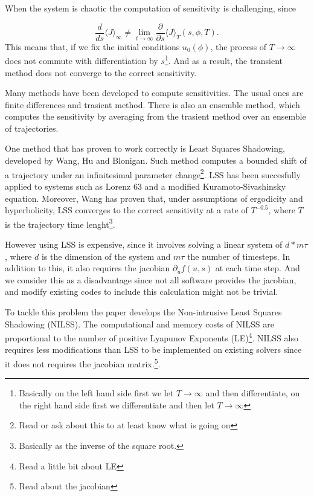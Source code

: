 \documentclass[10pt,twoside,a4paper]{article} %
\begin{document}
When the system is chaotic the computation of sensitivity is challenging, since

\begin{equation}
  \frac{d}{ds} \langle J \rangle_\infty \neq \lim_{t\to \infty} \frac{\partial}{\partial s} \langle J \rangle_T (s,\phi,T).
  \label{eq:3}
\end{equation}
This means that, if we fix the initial conditions $u_0(\phi)$, the process of $T\to\infty$ does not commute with differentiation by $s$\footnote{Basically on the left hand side first we let $T\to\infty$ and then differentiate, on the right hand side first we differentiate and then let $T\to\infty$}. And as a result, the transient method does not converge to the correct sensitivity.

Many methods have been developed to compute sensitivities. The usual ones are finite differences and trasient method. There is also an ensemble method, which computes the sensitivity by averaging from the trasient method over an ensemble of trajectories.

One method that has proven to work correctly is Least Squares Shadowing, developed by Wang, Hu and Blonigan. Such method computes a bounded shift of a trajectory under an infinitesimal parameter change\footnote{Read or ask about this to at least know what is going on}. LSS has been succesfully applied to systems such as Lorenz 63 and a modified Kuramoto-Sivashinsky equation. Moreover, Wang has proven that, under assumptions of ergodicity and hyperbolicity, LSS converges to the correct sensitivity at a rate of $T^{-0.5}$, where $T$ is the trajectory time lenght\footnote{Basically as the inverse of the square root.}.

However using LSS is expensive, since it involves solving a linear system of $d*m\tau$, where $d$ is the dimension of the system and $m\tau$ the number of timesteps. In addition to this, it also requires the jacobian $\partial_uf(u,s)$ at each time step. And we consider this as a disadvantage since not all software provides the jacobian, and modify existing codes to include this calculation might not be trivial.

To tackle this problem the paper develops the Non-intrusive Least Squares Shadowing (NILSS). The computational and memory costs of NILSS are proportional to the number of positive Lyapunov Exponents (LE)\footnote{Read a little bit about LE}. NILSS also requires less modifications than LSS to be implemented on existing solvers since it does not requires the jacobian matrix.\footnote{Read about the jacobian}.
\end{document}
